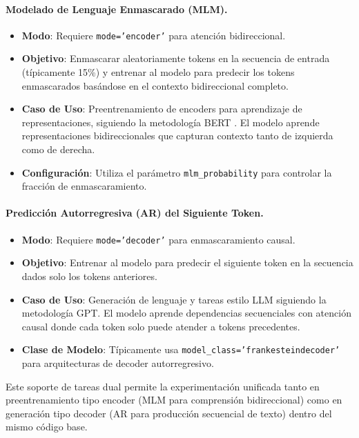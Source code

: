\paragraph{Modelado de Lenguaje Enmascarado (MLM).}
\begin{itemize}[leftmargin=*]
    \item \textbf{Modo}: Requiere \texttt{mode='encoder'} para atención bidireccional.
    \item \textbf{Objetivo}: Enmascarar aleatoriamente tokens en la secuencia de entrada (típicamente 15\%) y entrenar al modelo para predecir los tokens enmascarados basándose en el contexto bidireccional completo.
    \item \textbf{Caso de Uso}: Preentrenamiento de encoders para aprendizaje de representaciones, siguiendo la metodología BERT \citep{devlin_bert_2019}. El modelo aprende representaciones bidireccionales que capturan contexto tanto de izquierda como de derecha.
    \item \textbf{Configuración}: Utiliza el parámetro \texttt{mlm\_probability} para controlar la fracción de enmascaramiento.
\end{itemize}

\paragraph{Predicción Autorregresiva (AR) del Siguiente Token.}
\begin{itemize}[leftmargin=*]
    \item \textbf{Modo}: Requiere \texttt{mode='decoder'} para enmascaramiento causal.
    \item \textbf{Objetivo}: Entrenar al modelo para predecir el siguiente token en la secuencia dados solo los tokens anteriores.
    \item \textbf{Caso de Uso}: Generación de lenguaje y tareas estilo LLM siguiendo la metodología GPT. El modelo aprende dependencias secuenciales con atención causal donde cada token solo puede atender a tokens precedentes.
    \item \textbf{Clase de Modelo}: Típicamente usa \texttt{model\_class='frankesteindecoder'} para arquitecturas de decoder autorregresivo.
\end{itemize}

Este soporte de tareas dual permite la experimentación unificada tanto en preentrenamiento tipo encoder (MLM para comprensión bidireccional) como en generación tipo decoder (AR para producción secuencial de texto) dentro del mismo código base.

